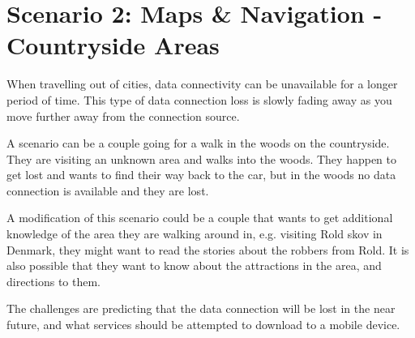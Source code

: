 \section{Scenario 2: Maps \& Navigation - Countryside Areas}
When travelling out of cities, data connectivity can be unavailable for a longer period of time. This type of data connection loss is slowly fading away as you move further away from the connection source.

A scenario can be a couple going for a walk in the woods on the countryside. They are visiting an unknown area and walks into the woods. They happen to get lost and wants to find their way back to the car, but in the woods no data connection is available and they are lost.

A modification of this scenario could be a couple that wants to get additional knowledge of the area they are walking around in, e.g. visiting Rold skov in Denmark, they might want to read the stories about the robbers from Rold. It is also possible that they want to know about the attractions in the area, and directions to them.

The challenges are predicting that the data connection will be lost in the near future, and what services should be attempted to download to a mobile device. 
